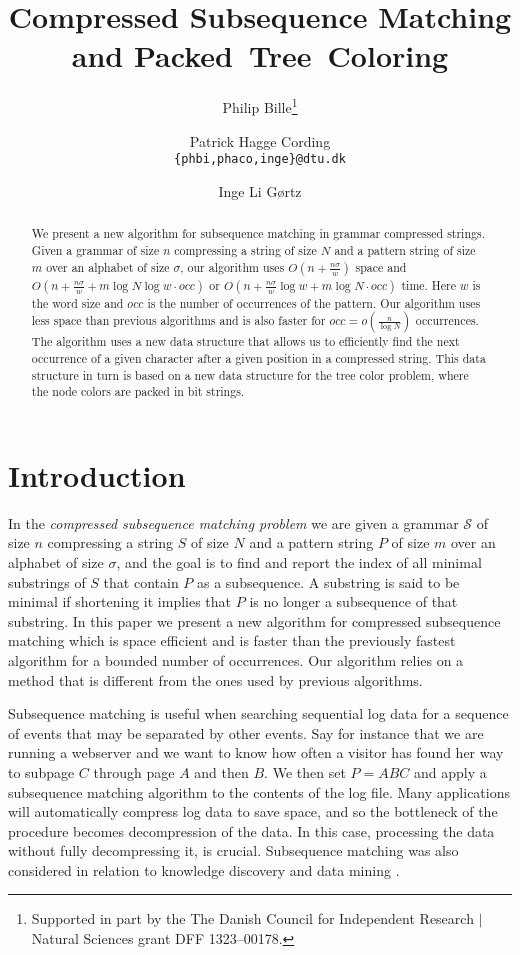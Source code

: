 \documentclass[11pt]{article}
\title{Compressed Subsequence Matching and Packed~Tree~Coloring}
\author{Philip Bille\thanks{Supported in part by the The Danish Council for Independent Research $\vert$ Natural Sciences grant DFF ­1323--00178.} \and Patrick Hagge Cording\\[0.4em]
\texttt{\small{\{phbi,phaco,inge\}@dtu.dk}} \and Inge Li G\o rtz\footnotemark[1]}
\newcommand{\str}{\ensuremath{S} }
\newcommand{\slp}{\ensuremath{\mathcal{S}} }
\newcommand{\pat}{\ensuremath{P}}
\begin{document}
	
\maketitle

\begin{abstract}
\noindent We present a new algorithm for subsequence matching in grammar compressed strings. Given a grammar of size $n$ compressing a string of size $N$ and a pattern string of size $m$ over an alphabet of size $\sigma$, our algorithm uses $O(n+\frac{n\sigma}{w})$ space and $O(n+\frac{n\sigma}{w}+m\log N\log w\cdot occ)$ or $O(n+\frac{n\sigma}{w}\log w+m\log N\cdot occ)$ time. Here $w$ is the word size and $occ$ is the number of occurrences of the pattern. Our algorithm uses less space than previous algorithms and is also faster for $occ=o(\frac{n}{\log N})$ occurrences. The algorithm uses a new data structure that allows us to efficiently find the next occurrence of a given character after a given position in a compressed string. This data structure in turn is based on a new data structure for the tree color problem, where the node colors are packed in bit strings.
\end{abstract}


\section{Introduction}


In the  \textit{compressed subsequence matching problem} we are given a grammar \slp of size $n$ compressing a string \str of size $N$ and a pattern string $P$ of size $m$ over an alphabet of size $\sigma$, and the goal is to find and report the index of all minimal substrings of $\str$ that contain $P$ as a subsequence. A substring is said to be minimal if shortening it implies that $P$ is no longer a subsequence of that substring. In this paper we present a new algorithm for compressed subsequence matching which is space efficient and is faster than the previously fastest algorithm for a bounded number of occurrences. Our algorithm relies on a method that is different from the ones used by previous algorithms.



Subsequence matching is useful when searching sequential log data for a sequence of events that may be separated by other events. Say for instance that we are running a webserver and we want to know how often a visitor has found her way to subpage $C$ through page $A$ and then $B$. We then set $\pat = ABC$ and apply a subsequence matching algorithm to the contents of the log file. Many applications will automatically compress log data to save space, and so the bottleneck of the procedure becomes decompression of the data. In this case, processing the data without fully decompressing it, is crucial. Subsequence matching was also considered in relation to knowledge discovery and data mining \cite{mannila1997discovery}.
\end{document}
